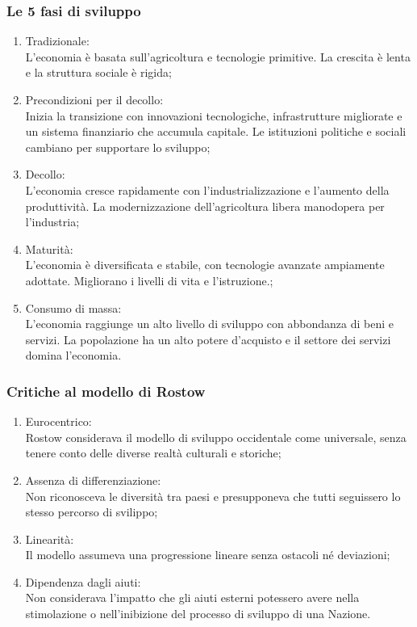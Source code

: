 \documentclass{article}
\begin{document}
\subsubsection{Le 5 fasi di sviluppo}
\begin{enumerate}
    \item Tradizionale:\\
        L'economia è basata sull'agricoltura e tecnologie primitive. La crescita è lenta e la
        struttura sociale è rigida;
    \item Precondizioni per il decollo:\\
        Inizia la transizione con innovazioni tecnologiche, infrastrutture migliorate e un sistema
        finanziario che accumula capitale. Le istituzioni politiche e sociali cambiano per
        supportare lo sviluppo;
    \item Decollo:\\
        L'economia cresce rapidamente con l'industrializzazione e l'aumento della produttività.
        La modernizzazione dell'agricoltura libera manodopera per l'industria;
    \item Maturità:\\
        L'economia è diversificata e stabile, con tecnologie avanzate ampiamente adottate.
        Migliorano i livelli di vita e l'istruzione.;
    \item Consumo di massa:\\
        L'economia raggiunge un alto livello di sviluppo con abbondanza di beni e servizi.
        La popolazione ha un alto potere d'acquisto e il settore dei servizi domina l'economia.
\end{enumerate}

\subsubsection{Critiche al modello di Rostow}
\begin{enumerate}
    \item Eurocentrico:\\
        Rostow considerava il modello di sviluppo occidentale come universale, senza tenere
        conto delle diverse realtà culturali e storiche;
    \item Assenza di differenziazione:\\
        Non riconosceva le diversità tra paesi e presupponeva che tutti seguissero lo stesso
        percorso di svilippo;
    \item Linearità:\\
        Il modello assumeva una progressione lineare senza ostacoli né deviazioni;
    \item Dipendenza dagli aiuti:\\
        Non considerava l'impatto che gli aiuti esterni potessero avere nella stimolazione o
        nell'inibizione del processo di sviluppo di una Nazione.
\end{enumerate}
\end{document}
